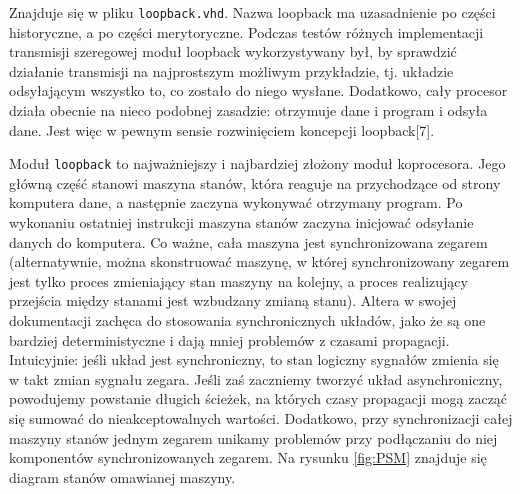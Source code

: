 Znajduje się w pliku \texttt{loopback.vhd}. Nazwa loopback ma uzasadnienie po części historyczne, a po części merytoryczne. Podczas testów różnych implementacji transmisji szeregowej moduł loopback wykorzystywany był, by sprawdzić działanie transmisji na najprostszym możliwym przykładzie, tj. układzie odsyłającym wszystko to, co zostało do niego wysłane. Dodatkowo, cały procesor działa obecnie na nieco podobnej zasadzie: otrzymuje dane i program i odsyła dane. Jest więc w pewnym sensie rozwinięciem koncepcji loopback[7].

Moduł \texttt{loopback} to najważniejszy i najbardziej złożony moduł koprocesora. Jego główną część stanowi maszyna stanów, która reaguje na przychodzące od strony komputera dane, a następnie zaczyna wykonywać otrzymany program. Po wykonaniu ostatniej instrukcji maszyna stanów zaczyna inicjować odsyłanie danych do komputera. Co ważne, cała maszyna jest synchronizowana zegarem (alternatywnie, można skonstruować maszynę, w której synchronizowany zegarem jest tylko proces zmieniający stan maszyny na kolejny, a proces realizujący przejścia między stanami jest wzbudzany zmianą stanu). Altera w swojej dokumentacji zachęca do stosowania synchronicznych układów, jako że są one bardziej deterministyczne i dają mniej problemów z czasami propagacji. Intuicyjnie: jeśli układ jest synchroniczny, to stan logiczny sygnałów zmienia się w takt zmian sygnału zegara. Jeśli zaś zaczniemy tworzyć układ asynchroniczny, powodujemy powstanie długich ścieżek, na których czasy propagacji mogą zacząć się sumować do nieakceptowalnych wartości. Dodatkowo, przy synchronizacji całej maszyny stanów jednym zegarem unikamy problemów przy podłączaniu do niej komponentów synchronizowanych zegarem. Na rysunku \ref{fig:PSM} znajduje się diagram stanów omawianej maszyny. 


